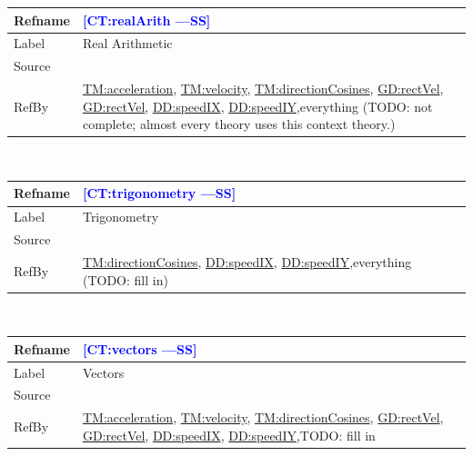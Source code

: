 \documentclass[12pt]{article}
\newcommand{\authornote}[3]{\textcolor{#1}{[#3 ---#2]}}
\newcommand{\authornote}[3]{}
\newcommand{\wss}[1]{\authornote{blue}{SS}{#1}}
\begin{document}
\medskip
\noindent
\begin{minipage}{\textwidth}
\begin{tabular}{>{\raggedright}p{}>{\raggedright\arraybackslash}p{}}
\toprule \textbf{Refname} & \textbf{\wss{CT:realArith}}
\label{CT:realArith}
\\ \midrule
Label & Real Arithmetic
\\ \midrule
Source & \cite{}
\\ \midrule
RefBy & \hyperref[TM:acceleration]{TM:acceleration},
\hyperref[TM:velocity]{TM:velocity},
\hyperref[TM:directionCosines]{TM:directionCosines},
\hyperref[GD:rectVel]{GD:rectVel}, \hyperref[GD:rectVel]{GD:rectVel}, \hyperref[DD:speedIX]{DD:speedIX}, \hyperref[DD:speedIY]{DD:speedIY},everything (TODO: not complete; almost every theory uses this context theory.)
\\ \bottomrule
\end{tabular}
\end{minipage}
~\\

\medskip
\noindent
\begin{minipage}{\textwidth}
\begin{tabular}{>{\raggedright}p{}>{\raggedright\arraybackslash}p{}}
\toprule \textbf{Refname} & \textbf{\wss{CT:trigonometry}}
\label{CT:trigonometry}
\\ \midrule
Label & Trigonometry
\\ \midrule
Source & \cite{}
\\ \midrule
RefBy & \hyperref[TM:directionCosines]{TM:directionCosines}, \hyperref[DD:speedIX]{DD:speedIX}, \hyperref[DD:speedIY]{DD:speedIY},everything (TODO: fill in)
\\ \bottomrule
\end{tabular}
\end{minipage}
~\\

\medskip
\noindent
\begin{minipage}{\textwidth}
\begin{tabular}{>{\raggedright}p{}>{\raggedright\arraybackslash}p{}}
\toprule \textbf{Refname} & \textbf{\wss{CT:vectors}}
\label{CT:vectors}
\\ \midrule
Label & Vectors
\\ \midrule
Source & \cite{}
\\ \midrule
RefBy & \hyperref[TM:acceleration]{TM:acceleration},
\hyperref[TM:velocity]{TM:velocity},
\hyperref[TM:directionCosines]{TM:directionCosines},
\hyperref[GD:rectVel]{GD:rectVel}, \hyperref[GD:rectVel]{GD:rectVel}, \hyperref[DD:speedIX]{DD:speedIX}, \hyperref[DD:speedIY]{DD:speedIY},TODO: fill in
\\ \bottomrule
\end{tabular}
\end{minipage}
~\\
\end{document}

